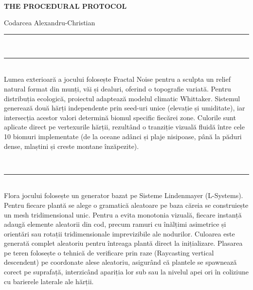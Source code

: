\documentclass[11pt,a4paper]{article}
\begin{document}
\pagestyle{empty}

\begin{center}
    {\color{primary}\LARGE\bfseries THE PROCEDURAL PROTOCOL} \\[0.2cm]
\end{center}
\begin{flushright}
    {\color{textdark}\large Codarcea Alexandru-Christian} \\[0.1cm]
\end{flushright}
\rule{\textwidth}{1.5pt}
\vspace{0.3cm}

\vspace{0.3cm}
 \\
\rule{\textwidth}{0.8pt} \\
Lumea exterioară a jocului folosește Fractal Noise pentru a sculpta un relief natural format din munți, văi și dealuri, oferind o topografie variată. Pentru distribuția ecologică, proiectul adaptează modelul climatic Whittaker. Sistemul generează două hărți independente prin seed-uri unice (elevație și umiditate), iar intersecția acestor valori determină biomul specific fiecărei zone. Culorile sunt aplicate direct pe vertexurile hărții, rezultând o tranziție vizuală fluidă între cele 10 biomuri implementate (de la oceane adânci și plaje nisipoase, până la păduri dense, mlaștini și creste montane înzăpezite).

\vspace{0.4cm}
 \\
\rule{\textwidth}{0.8pt} \\
Flora jocului folosește un generator bazat pe Sisteme Lindenmayer (L-Systems). Pentru fiecare plantă se alege o gramatică aleatoare pe baza căreia se construiește un mesh tridimensional unic. Pentru a evita monotonia vizuală, fiecare instanță adaugă elemente aleatorii din cod, precum ramuri cu înălțimi asimetrice și orientări sau rotații tridimensionale imprevizibile ale nodurilor. Culoarea este generată complet aleatoriu pentru întreaga plantă direct la inițializare. Plasarea pe teren folosește o tehnică de verificare prin raze (Raycasting vertical descendent) pe coordonate alese aleatoriu, asigurând că plantele se spawnează corect pe suprafață, interzicând apariția lor sub sau la nivelul apei ori în coliziune cu barierele laterale ale hărții.
\end{document}
